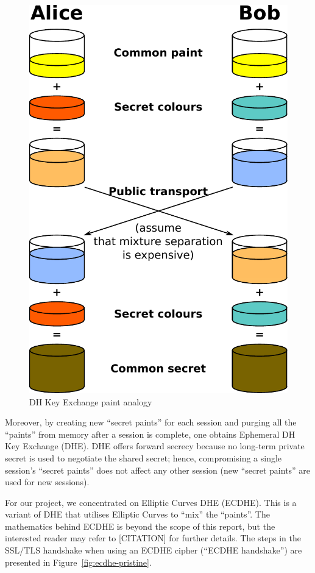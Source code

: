 \documentclass[../../main.tex]{subfiles}
\begin{document}
\begin{figure}[H]
  \centering
  \includegraphics[scale=0.4]{images/paint_color.pdf}
  \caption{DH Key Exchange paint analogy \cite{paints}}
  \label{fig:paint}
\end{figure}
Moreover, by creating new ``secret paints'' for each session and
purging all the ``paints'' from memory after a session is complete,
one obtains Ephemeral DH Key Exchange (DHE). DHE offers forward
secrecy because no long-term private secret is used to negotiate the
shared secret; hence, compromising a single session's ``secret
paints'' does not affect any other session (new ``secret paints'' are
used for new sessions).

For our project, we concentrated on Elliptic Curves DHE (ECDHE).
This is a variant of DHE that utilises Elliptic Curves to ``mix''
the ``paints''. The mathematics behind ECDHE is beyond the scope of
this report, but the interested reader may refer to [CITATION] for
further details. The steps in the SSL/TLS handshake when using an
ECDHE cipher (``ECDHE handshake'') are presented in
Figure~\ref{fig:ecdhe-pristine}.
\end{document}
